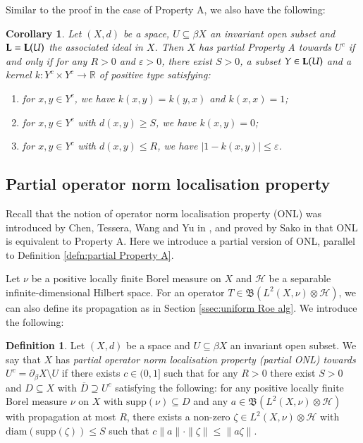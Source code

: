 \documentclass[12pt, a4paper]{amsart}
\numberwithin{equation}{section}
\newtheorem{cor}[thm]{Corollary}
\theoremstyle{definition}
\newtheorem{defn}[thm]{Definition}
\theoremstyle{remark}
\def\RR{\mathbb{R}}
\def\H{\mathcal{H}}
\def\L{\mathcal{L}}
\def\B{\mathfrak{B}}
\def\supp{\mathrm{supp}}
\def\diam{\mathrm{diam}}
\def\L{{\bf L}}
\begin{document}
Similar to the proof in the case of Property A, we also have the following:

\begin{cor}\label{cor:char for partial A}
Let $(X,d)$ be a space, $U \subseteq \beta X$ an invariant open subset and $\L=\L(U)$ the associated ideal in $X$. Then $X$ has partial Property A towards $U^c$ \emph{if and only if} for any $R>0$ and $\varepsilon>0$, there exist $S>0$, a subset $Y \in \L(U)$ and a kernel $k: Y^c \times Y^c \to \RR$ of positive type satisfying:
\begin{enumerate}
 \item for $x,y\in Y^c$, we have $k(x,y)=k(y,x)$ and $k(x,x) =1$;
 \item for $x,y\in Y^c$ with $d(x,y) \geq S$, we have $k(x,y)=0$;
 \item for $x,y\in Y^c$ with $d(x,y) \leq R$, we have $|1-k(x,y)| \leq \varepsilon$.
\end{enumerate}
\end{cor}



\subsection{Partial operator norm localisation property}

Recall that the notion of operator norm localisation property (ONL) was introduced by Chen, Tessera, Wang and Yu in \cite{CTWY08}, and proved by Sako in \cite{Sak14} that ONL is equivalent to Property A. Here we introduce a partial version of ONL, parallel to Definition \ref{defn:partial Property A}.

Let $\nu$ be a positive locally finite Borel measure on $X$ and $\H$ be a separable infinite-dimensional Hilbert space. For an operator $T \in \B(L^2(X,\nu) \otimes \H)$, we can also define its propagation as in Section \ref{ssec:uniform Roe alg}. We introduce the following:

\begin{defn}\label{defn:partial ONL}
Let $(X,d)$ be a space and $U \subseteq \beta X$ an invariant open subset. We say that $X$ has \emph{partial operator norm localisation property (partial ONL) towards $U^c=\partial_\beta X \setminus U$} if there exists $c \in (0,1]$ such that for any $R>0$ there exist $S>0$ and $D \subseteq X$ with $\overline{D} \supseteq U^c$ satisfying the following: for any positive locally finite Borel measure $\nu$ on $X$ with $\supp(\nu) \subseteq D$ and any $a \in \B(L^2(X,\nu) \otimes \H)$ with propagation at most $R$, there exists a non-zero $\zeta \in L^2(X,\nu) \otimes \H$ with $\diam(\supp(\zeta)) \leq S$ such that $c\|a\| \cdot \|\zeta\| \leq \|a \zeta\|$. 
\end{defn}
\end{document}
